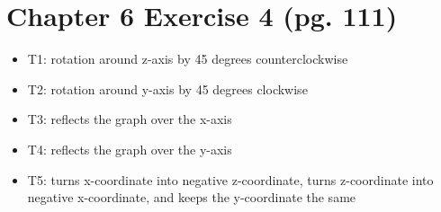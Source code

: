 \documentclass{article}
\begin{document}
\section{Chapter 6 Exercise 4 (pg. 111)}
\begin{itemize}
    \item T1: rotation around z-axis by 45 degrees counterclockwise
    \item T2: rotation around y-axis by 45 degrees clockwise
    \item T3: reflects the graph over the x-axis
    \item T4: reflects the graph over the y-axis
    \item T5: turns x-coordinate into negative z-coordinate, turns z-coordinate into negative x-coordinate, and keeps the y-coordinate the same
\end{itemize}
\end{document}
